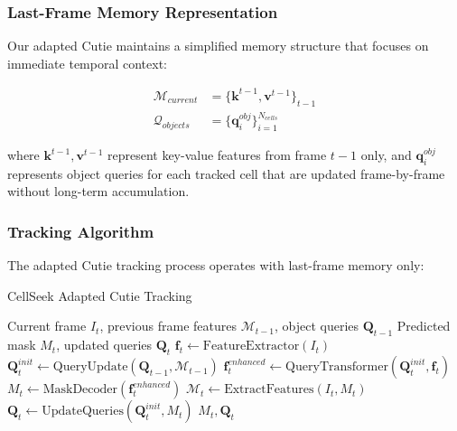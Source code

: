 \documentclass[12pt]{article}
\begin{document}
\subsubsection{Last-Frame Memory Representation}

Our adapted Cutie maintains a simplified memory structure that focuses on immediate temporal context:

\begin{align}
  \mathcal{M}_{current} & = \{\mathbf{k}^{t-1}, \mathbf{v}^{t-1}\}_{t-1} \\
  \mathcal{Q}_{objects} & = \{\mathbf{q}_i^{obj}\}_{i=1}^{N_{cells}}
\end{align}

where $\mathbf{k}^{t-1}, \mathbf{v}^{t-1}$ represent key-value features from frame $t-1$ only, and $\mathbf{q}_i^{obj}$ represents object queries for each tracked cell that are updated frame-by-frame without long-term accumulation.

\subsubsection{Tracking Algorithm}

The adapted Cutie tracking process operates with last-frame memory only:

\begin{algorithm}[H]
  \caption{CellSeek Adapted Cutie Tracking}
  \begin{algorithmic}[1]
    \REQUIRE Current frame $I_t$, previous frame features $\mathcal{M}_{t-1}$, object queries $\mathbf{Q}_{t-1}$
    \ENSURE Predicted mask $M_t$, updated queries $\mathbf{Q}_t$
    \STATE $\mathbf{f}_t \leftarrow \text{FeatureExtractor}(I_t)$
    \STATE $\mathbf{Q}_t^{init} \leftarrow \text{QueryUpdate}(\mathbf{Q}_{t-1}, \mathcal{M}_{t-1})$
    \STATE $\mathbf{f}_t^{enhanced} \leftarrow \text{QueryTransformer}(\mathbf{Q}_t^{init}, \mathbf{f}_t)$
    \STATE $M_t \leftarrow \text{MaskDecoder}(\mathbf{f}_t^{enhanced})$
    \STATE $\mathcal{M}_t \leftarrow \text{ExtractFeatures}(I_t, M_t)$ 
    \STATE $\mathbf{Q}_t \leftarrow \text{UpdateQueries}(\mathbf{Q}_t^{init}, M_t)$
    \RETURN $M_t, \mathbf{Q}_t$
  \end{algorithmic}
\end{algorithm}

\end{document}

